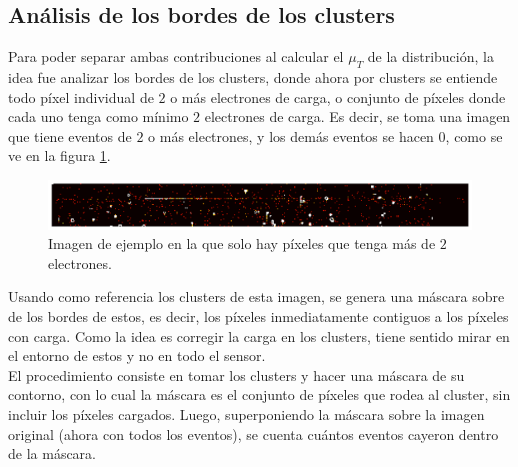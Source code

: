 \subsection{Análisis de los bordes de los clusters}
\noindent Para poder separar ambas contribuciones al calcular el $\mu_{T}$ de la distribución, la idea fue analizar los bordes de los clusters, donde ahora por clusters se entiende todo píxel individual de $2$ o más electrones de carga, o conjunto de píxeles donde cada uno tenga como mínimo $2$ electrones de carga. Es decir, se toma una imagen que tiene eventos de $2$ o más electrones, y los demás eventos se hacen $0$, como se ve en la figura \ref{fig:ImagenFits2omasElectrones}.
\begin{figure}[h]
    \centering
    \includegraphics[scale=0.4]{Figs/imagen_fits_2_o_mas.pdf}
    \caption{\footnotesize{Imagen de ejemplo en la que solo hay píxeles que tenga más de $2$ electrones.}}
    \label{fig:ImagenFits2omasElectrones}
\end{figure}
Usando como referencia los clusters de esta imagen, se genera una máscara sobre de los bordes de estos, es decir, los píxeles inmediatamente contiguos a los píxeles con carga. Como la idea es corregir la carga en los clusters, tiene sentido mirar en el entorno de estos y no en todo el sensor.\\
\indent El procedimiento consiste en tomar los clusters y hacer una máscara de su contorno, con lo cual la máscara es el conjunto de píxeles que rodea al cluster, sin incluir los píxeles cargados. Luego, superponiendo la máscara sobre la imagen original (ahora con todos los eventos), se cuenta cuántos eventos cayeron dentro de la máscara. 
